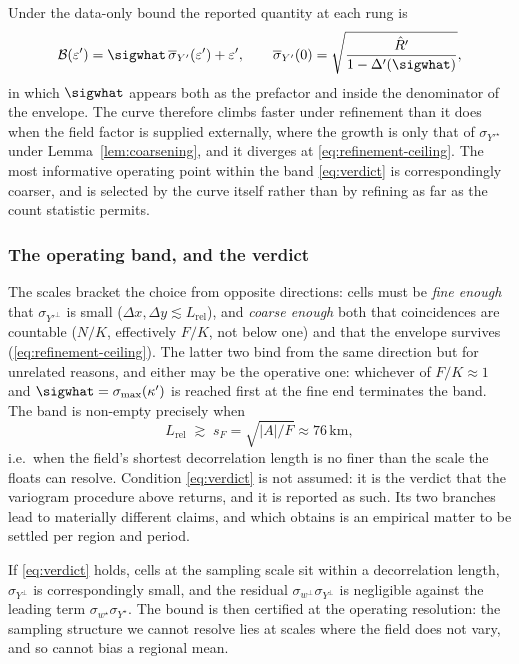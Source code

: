 \begin{remark}
\label{rem:steeper-curve}
Under the data-only bound the reported quantity at each rung is
\[
  \mathcal{B}(\varepsilon')
  =\sigwhat\,\overline{\sigma}_{Y'}(\varepsilon')+\varepsilon',
  \qquad
  \overline{\sigma}_{Y'}(0)=\sqrt{\frac{\hat R'}{1-\Delta'(\sigwhat)}},
\]
in which $\sigwhat$ appears both as the prefactor and inside the
denominator of the envelope. The curve therefore climbs faster under refinement than it
does when the field factor is supplied externally, where the growth is
only that of $\sigma_{Y'^{\star}}$ under Lemma~\ref{lem:coarsening}, and
it diverges at \eqref{eq:refinement-ceiling}. The most informative
operating point within the band \eqref{eq:verdict} is correspondingly
coarser, and is selected by the curve itself rather than by refining as
far as the count statistic permits.
\end{remark}

\subsubsection*{The operating band, and the verdict}

The scales bracket the choice from opposite directions: cells must be
\emph{fine enough} that $\sigma_{Y'^{\perp}}$ is small
($\Delta x,\Delta y\lesssim L_{\mathrm{rel}}$), and \emph{coarse enough}
both that coincidences are countable ($N/K$, effectively $F/K$, not below
one) and that the envelope survives
(\eqref{eq:refinement-ceiling}). The latter two bind from the same
direction but for unrelated reasons, and either may be the operative one:
whichever of $F/K\approx1$ and
$\sigwhat=\sigma_{\max}(\kappa')$ is reached first at the fine end
terminates the band. The band is non-empty precisely when
\begin{equation}
  L_{\mathrm{rel}} \;\gtrsim\; s_F=\sqrt{|A|/F}\approx 76\,\mathrm{km},
  \label{eq:verdict}
\end{equation}
i.e.\ when the field's shortest decorrelation length is no finer than the
scale the floats can resolve. Condition \eqref{eq:verdict} is not assumed:
it is the verdict that the variogram procedure above returns, and it is
reported as such. Its two branches lead to materially different claims,
and which obtains is an empirical matter to be settled per region and
period.

If \eqref{eq:verdict} holds, cells at the sampling scale sit within a
decorrelation length, $\sigma_{Y^{\perp}}$ is correspondingly small, and
the residual $\sigma_{w^{\perp}}\sigma_{Y^{\perp}}$ is negligible against
the leading term $\sigma_{w^{\star}}\sigma_{Y^{\star}}$. The bound is then
certified at the operating resolution: the sampling structure we cannot
resolve lies at scales where the field does not vary, and so cannot bias
a regional mean.

